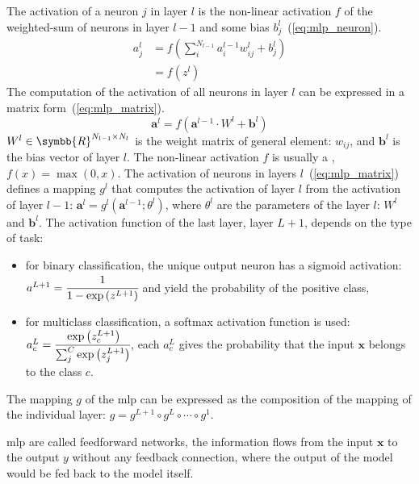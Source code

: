 \documentclass[../main.tex]{subfiles}
\begin{document}
	 The activation of a neuron \(j\) in layer \(l\) is the non-linear activation \(f\) of the weighted-sum of neurons in layer \(l-1\) and some bias \(b_{j}^{l}\)~(\cref{eq:mlp_neuron}).
	 \begin{align}
		 a_{j}^{l} & = f\left(\sum_{i}^{N_{l-1}}a_{i}^{l-1}w_{ij}^{l} + b_{j}^{l} \right) \\ \label{eq:mlp_neuron}
		           & = f\left(z^{l}\right)
	 \end{align}
	 The computation of the activation of all neurons in layer \(l\) can be expressed in a matrix form~(\cref{eq:mlp_matrix}).
	 \begin{equation}
		 \symbf{a}^{l} = f\left( \symbf{a}^{l-1} \cdot W^l + \symbf{b}^{l} \right) \label{eq:mlp_matrix}
	 \end{equation}
	 \(W^l \in \symbb{R}^{N_{l-1} \times N_{l}}\) is the weight matrix of general element: \(w_{ij}\), and \(\symbf{b}^{l}\) is the bias vector of layer \(l\).
	 The non-linear activation \(f\) is usually a , \(f\left(x\right) = \max\left(0, x\right)\).
	 The activation of neurons in layers \(l\)~(\cref{eq:mlp_matrix}) defines a mapping \(g^{l}\) that computes the activation of layer \(l\) from the activation of layer \(l-1\): \( \symbf{a}^{l} = g^{l}\left(\symbf{a}^{l-1}; \theta^{l}\right)\), where \(\theta^{l}\) are the parameters of the layer \(l\): \(W^l\) and \( \symbf{b}^{l}\).
	 The activation function of the last layer, layer \(L+1\), depends on the type of task:
	 \begin{itemize}
		 \item for binary classification, the unique output neuron has a sigmoid activation: \(a^{L+1} = \cfrac{1}{1-\exp\left(z^{L+1}\right)}\) and  yield the probability of the positive class,
		 \item for multiclass classification, a softmax activation function is used: \(a_{c}^{L} = \cfrac{\exp\left(z_{c}^{L+1}\right)}{\sum_{j}^{C}\exp\left(z_{j}^{L+1}\right)}\), each \(a_{c}^{L}\) gives the probability that the input \(\symbf{x}\) belongs to the class \(c\).
	 \end{itemize}
	 The mapping \(g\) of the \gls{mlp} can be expressed as the composition of the mapping of the individual layer: \(g = g^{L+1} \circ g^{L} \circ \cdots \circ g^{1}\).

	 \Gls{mlp} are called feedforward networks, the information flows from the input \(\symbf{x}\) to the output \(y\) without any feedback connection, where the output of the model would be fed back to the model itself.
\end{document}
